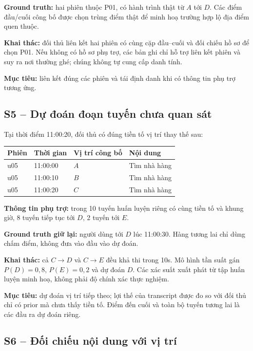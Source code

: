 \textbf{Ground truth:} hai phiên thuộc P01, có hành trình thật từ $A$ tới $D$. Các điểm đầu/cuối công bố được chọn trùng điểm thật để minh hoạ trường hợp lộ địa điểm quen thuộc.

\textbf{Khai thác:} đối thủ liên kết hai phiên có cùng cặp đầu--cuối và đối chiếu hồ sơ để chọn P01. Nếu không có hồ sơ phụ trợ, các bản ghi chỉ hỗ trợ liên kết phiên và suy ra nơi thường ghé; chúng không tự cung cấp danh tính.

\textbf{Mục tiêu:} liên kết đúng các phiên và tái định danh khi có thông tin phụ trợ tương ứng.

\clearpage
\subsection{S5 -- Dự đoán đoạn tuyến chưa quan sát}
\label{example:s5}

Tại thời điểm 11:00:20, đối thủ có đúng tiền tố vị trí thay thế sau:
\begin{center}\small
\begin{tabular}{llll}
\toprule
Phiên & Thời gian & Vị trí công bố & Nội dung\\
\midrule
u05 & 11:00:00 & $A$ & Tìm nhà hàng\\
u05 & 11:00:10 & $B$ & Tìm nhà hàng\\
u05 & 11:00:20 & $C$ & Tìm nhà hàng\\
\bottomrule
\end{tabular}
\end{center}
\textbf{Thông tin phụ trợ:} trong 10 tuyến huấn luyện riêng có cùng tiền tố và khung giờ, 8 tuyến tiếp tục tới $D$, 2 tuyến tới $E$.

\textbf{Ground truth giữ lại:} người dùng tới $D$ lúc 11:00:30. Hàng tương lai chỉ dùng chấm điểm, không đưa vào đầu vào dự đoán.

\textbf{Khai thác:} cả $C\rightarrow D$ và $C\rightarrow E$ đều khả thi trong 10s. Mô hình tần suất gán $P(D)=0{,}8$, $P(E)=0{,}2$ và dự đoán $D$. Các xác suất xuất phát từ tập huấn luyện minh hoạ, không phải độ chính xác thực nghiệm.

\textbf{Mục tiêu:} dự đoán vị trí tiếp theo; lợi thế của transcript được đo so với đối thủ chỉ có prior mà chưa thấy tiền tố. Điểm đến cuối và toàn bộ tuyến tương lai là các đầu ra dự đoán riêng.

\clearpage
\subsection{S6 -- Đối chiếu nội dung với vị trí}
\label{example:s6}

